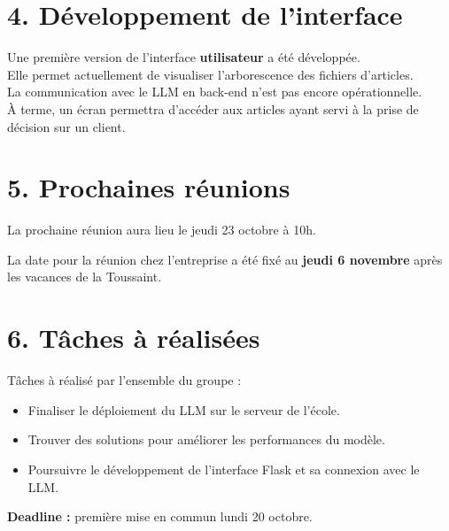 \documentclass[a4paper,11pt]{article}
\begin{document}
\section*{4. Développement de l’interface}
Une première version de l’interface \textbf{utilisateur} a été développée. \\
Elle permet actuellement de visualiser l’arborescence des fichiers d’articles. \\
La communication avec le LLM en back-end n’est pas encore opérationnelle. \\
À terme, un écran permettra d’accéder aux articles ayant servi à la prise de décision sur un client.

\section*{5. Prochaines réunions}
La prochaine réunion aura lieu le jeudi 23 octobre à 10h.

La date pour la réunion chez l'entreprise a été fixé au \textbf{jeudi 6 novembre} après les vacances de la Toussaint.

\section*{6. Tâches à réalisées}
Tâches à réalisé par l'ensemble du groupe :
\begin{itemize}
    \item Finaliser le déploiement du LLM sur le serveur de l’école.
    \item Trouver des solutions pour améliorer les performances du modèle.
    \item Poursuivre le développement de l’interface Flask et sa connexion avec le LLM.
    
\end{itemize}
\textbf{Deadline :} première mise en commun lundi 20 octobre.
\end{document}
